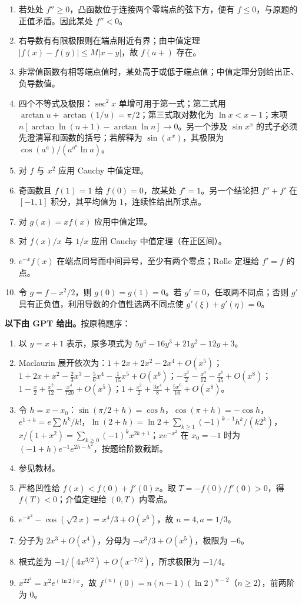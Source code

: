 \begin{enumerate}
\item 若处处 $f''\ge0$，凸函数位于连接两个零端点的弦下方，便有 $f\le0$，与原题的正值矛盾。因此某处 $f''<0$。
\item 右导数有有限极限则在端点附近有界；由中值定理 $|f(x)-f(y)|\le M|x-y|$，故 $f(a+)$ 存在。
\item 非常值函数有相等端点值时，某处高于或低于端点值；中值定理分别给出正、负导数值。
\item 四个不等式及极限：$\sec^2x$ 单增可用于第一式；第二式用 $\arctan u+\arctan(1/u)=\pi/2$；第三式取对数化为 $\ln x<x-1$；末项 $n[\arctan\ln(n+1)-\arctan\ln n]\to0$。另一个涉及 $\sin x^x$ 的式子必须先澄清幂和函数的括号；若解释为 $\sin(x^x)$，其极限为 $\cos(a^a)/(a^{a^a}\ln a)$。
\item 对 $f$ 与 $x^2$ 应用 Cauchy 中值定理。
\item 奇函数且 $f(1)=1$ 给 $f(0)=0$，故某处 $f'=1$。另一个结论把 $f''+f'$ 在 $[-1,1]$ 积分，其平均值为 $1$，连续性给出所求点。
\item 对 $g(x)=xf(x)$ 应用中值定理。
\item 对 $f(x)/x$ 与 $1/x$ 应用 Cauchy 中值定理（在正区间）。
\item $e^{-x}f(x)$ 在端点同号而中间异号，至少有两个零点；Rolle 定理给 $f'=f$ 的点。
\item 令 $g=f-x^2/2$，则 $g(0)=g(1)=0$。若 $g'\equiv0$，任取两不同点；否则 $g'$ 具有正负值，利用导数的介值性选两不同点使 $g'(\xi)+g'(\eta)=0$。
\end{enumerate}
\noindent\textbf{以下由 GPT 给出。}按原稿题序：
\begin{enumerate}
\item 以 $y=x+1$ 表示，原多项式为 $5y^4-16y^3+21y^2-12y+3$。
\item Maclaurin 展开依次为：$1+2x+2x^2-2x^4+O(x^5)$；$1+2x+x^2-\frac23x^3-\frac56x^4-\frac1{15}x^5+O(x^6)$；$-\frac{x^2}{2}-\frac{x^4}{12}-\frac{x^6}{45}+O(x^8)$；$1-\frac{x}{2}+\frac{x^2}{12}-\frac{x^4}{720}+O(x^5)$；$1+\frac{x^2}{2}+\frac{3x^4}{8}+\frac{5x^6}{16}+O(x^8)$。
\item 令 $h=x-x_0$：$\sin(\pi/2+h)=\cos h$，$\cos(\pi+h)=-\cos h$，$e^{1+h}=e\sum h^k/k!$，$\ln(2+h)=\ln2+\sum_{k\ge1}(-1)^{k-1}h^k/(k2^k)$，$x/(1+x^2)=\sum_{k\ge0}(-1)^kx^{2k+1}$；$x e^{-x^2}$ 在 $x_0=-1$ 时为 $(-1+h)e^{-1}e^{2h-h^2}$，按题给阶数截断。
\item 参见教材。
\item 严格凹性给 $f(x)<f(0)+f'(0)x$。取 $T=-f(0)/f'(0)>0$，得 $f(T)<0$；介值定理给 $(0,T)$ 内零点。
\item $e^{-x^2}-\cos(\sqrt2x)=x^4/3+O(x^6)$，故 $n=4,a=1/3$。
\item 分子为 $2x^3+O(x^4)$，分母为 $-x^3/3+O(x^5)$，极限为 $-6$。
\item 根式差为 $-1/(4x^{3/2})+O(x^{-7/2})$，所求极限为 $-1/4$。
\item $x^22^x=x^2e^{(\ln2)x}$，故 $f^{(n)}(0)=n(n-1)(\ln2)^{n-2}$（$n\ge2$），前两阶为 $0$。
\end{enumerate}

